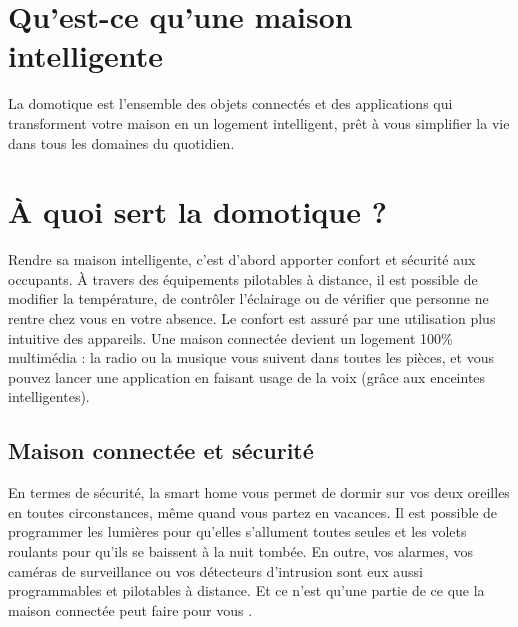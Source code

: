 \documentclass[12pt,twoside,a4paper]{article}
\begin{document}
\section{Qu’est-ce qu’une maison intelligente}

La domotique est l’ensemble des objets connectés et des applications qui transforment votre maison en un logement intelligent,
 prêt à vous simplifier la vie dans tous les domaines du quotidien. 

\section{À quoi sert la domotique ?}

Rendre sa maison intelligente, c’est d’abord apporter confort et sécurité aux occupants. À travers des équipements pilotables à distance, il est possible de modifier la température, de contrôler l’éclairage ou de vérifier que personne ne rentre chez vous en votre absence.
Le confort est assuré par une utilisation plus intuitive des appareils. Une maison connectée devient un logement 100\%  multimédia : la radio ou la musique vous suivent dans toutes les pièces, et vous pouvez lancer une application en faisant usage de la voix (grâce aux enceintes intelligentes). 

\subsection{Maison connectée et sécurité}

En termes de sécurité, la smart home vous permet de dormir sur vos deux oreilles en toutes circonstances, même quand vous partez en vacances. Il est possible de programmer les lumières pour qu’elles s’allument toutes seules et les volets roulants pour qu’ils se baissent à la nuit tombée.
En outre, vos alarmes, vos caméras de surveillance ou vos détecteurs d’intrusion sont eux aussi programmables et pilotables à distance. Et ce n’est qu’une partie de ce que la maison connectée peut faire pour vous .
\end{document}
